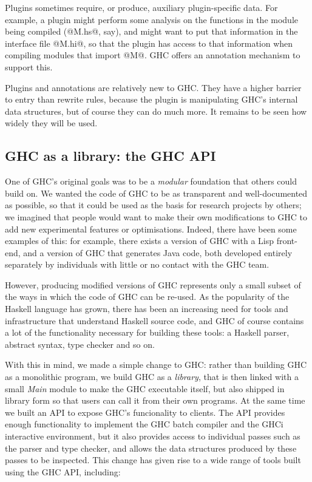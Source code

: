 \documentclass{article}
\begin{document}
{Plugins sometimes require, or produce, auxiliary plugin-specific data. 
For example, a plugin might perform some analysis on the functions in the
module being compiled (@M.hs@, say), 
and might want to put that information in the interface file @M.hi@, so that
the plugin has access to that information when compiling modules that import @M@.
GHC offers an annotation mechanism to support this.

Plugins and annotations are relatively new to GHC.  They have a higher
barrier to entry than rewrite rules, because the plugin is
manipulating GHC's internal data structures, but of course they can do
much more.  It remains to be seen how widely they will be used.


\subsection{GHC as a library: the GHC API}
\label{s:ghcapi}

One of GHC's original goals was to be a \emph{modular} foundation that
others could build on.  We wanted the code of GHC to be as transparent
and well-documented as possible, so that it could be used as the basis
for research projects by others; we imagined that people would want to
make their own modifications to GHC to add new experimental features
or optimisations.  Indeed, there have been some examples of this: for
example, there exists a version of GHC with a Lisp front-end, and a
version of GHC that generates Java code, both developed entirely
separately by individuals with little or no contact with the GHC team.

However, producing modified versions of GHC represents only a small
subset of the ways in which the code of GHC can be re-used.  As the
popularity of the Haskell language has grown, there has been an
increasing need for tools and infrastructure that understand Haskell
source code, and GHC of course contains a lot of the functionality
necessary for building these tools: a Haskell parser, abstract syntax,
type checker and so on.

With this in mind, we made a simple change to GHC: rather than
building GHC as a monolithic program, we build GHC as a
\emph{library}, that is then linked with a small \emph{Main} module to
make the GHC executable itself, but also shipped in library form so
that users can call it from their own programs.  At the same time we
built an API to expose GHC's funcionality to clients.  The API
provides enough functionality to implement the GHC batch compiler and
the GHCi interactive environment, but it also provides access to
individual passes such as the parser and type checker, and allows the
data structures produced by these passes to be inspected.  This change
has given rise to a wide range of tools built using the GHC API,
including:

}
\end{document}
